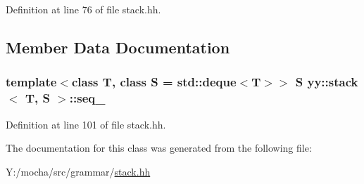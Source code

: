 Definition at line 76 of file stack.hh.



\subsection{Member Data Documentation}
\hypertarget{classyy_1_1stack_ae0a9cbe8fb11651438de273ee7a6ef2e}{
\subsubsection[{seq\_\-}]{\setlength{\rightskip}{0pt plus 5cm}template$<$class T, class S = std::deque$<$T$>$$>$ S {\bf yy::stack}$<$ T, S $>$::{\bf seq\_\-}}}
\label{classyy_1_1stack_ae0a9cbe8fb11651438de273ee7a6ef2e}


Definition at line 101 of file stack.hh.



The documentation for this class was generated from the following file:\begin{DoxyCompactItemize}
\item 
Y:/mocha/src/grammar/\hyperlink{stack_8hh}{stack.hh}\end{DoxyCompactItemize}
